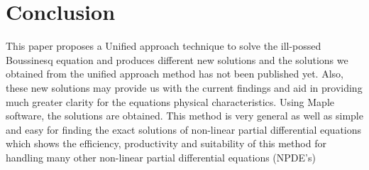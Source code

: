 \documentclass{article}
\numberwithin{equation}{section}
\begin{document}
\section{Conclusion}\label{s5}
\noindent This paper proposes a Unified approach technique to solve the ill-possed Boussinesq equation and produces different new solutions and the solutions we obtained from the unified approach method has not been published yet. Also, these new solutions may provide us with the current findings and aid in providing much greater clarity for the equations physical characteristics. Using Maple software, the solutions are obtained. This method is very general as well as simple and easy for finding the exact solutions of non-linear partial differential equations which shows the efficiency, productivity and suitability of this method for handling many other non-linear partial differential equations (NPDE's)
\end{document}
